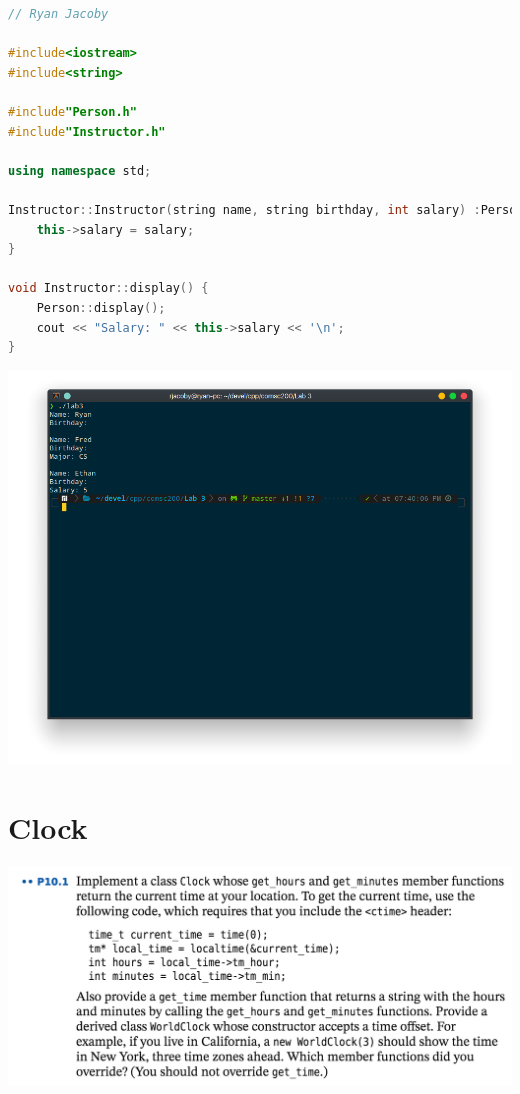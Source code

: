 \documentclass[letterpaper, 11pt]{article}
\begin{document}
\begin{lstlisting}[language=C++, caption=InstructorImp.cpp]
// Ryan Jacoby

#include<iostream>
#include<string>

#include"Person.h"
#include"Instructor.h"

using namespace std;

Instructor::Instructor(string name, string birthday, int salary) :Person(name, birthday) {
    this->salary = salary;
}

void Instructor::display() {
    Person::display();
    cout << "Salary: " << this->salary << '\n';
}
\end{lstlisting}

\includegraphics[scale=0.5]{person_run.png}

\section{Clock}

\includegraphics[scale=0.5]{clock.png}
\end{document}
